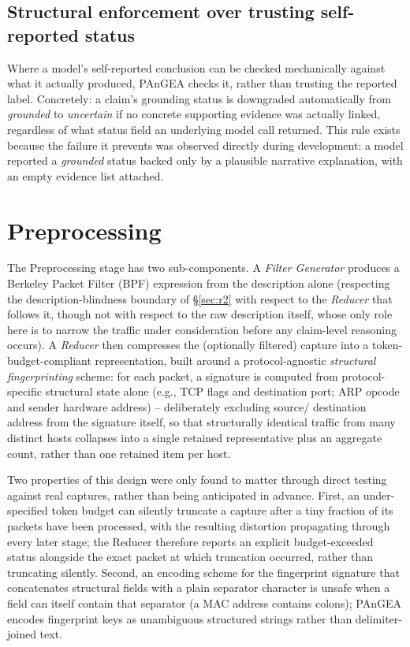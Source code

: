 \documentclass[sigconf,nonacm]{acmart}
\begin{document}
\subsection{Structural enforcement over trusting self-reported status}
\label{sec:enforcement}

Where a model's self-reported conclusion can be checked mechanically against
what it actually produced, PAnGEA checks it, rather than trusting the reported
label. Concretely: a claim's grounding status is downgraded automatically from
\emph{grounded} to \emph{uncertain} if no concrete supporting evidence was
actually linked, regardless of what status field an underlying model call
returned. This rule exists because the failure it prevents was observed
directly during development: a model reported a \emph{grounded} status backed
only by a plausible narrative explanation, with an empty evidence list attached.

\section{Preprocessing}
\label{sec:preprocessing}

The Preprocessing stage has two sub-components. A \emph{Filter Generator}
produces a Berkeley Packet Filter (BPF) expression from the description alone
(respecting the description-blindness boundary of \S\ref{sec:r2} with respect
to the \emph{Reducer} that follows it, though not with respect to the raw
description itself, whose only role here is to narrow the traffic under
consideration before any claim-level reasoning occurs). A \emph{Reducer} then
compresses the (optionally filtered) capture into a token-budget-compliant
representation, built around a protocol-agnostic \emph{structural
fingerprinting} scheme: for each packet, a signature is computed from
protocol-specific structural state alone (e.g., TCP flags and destination port;
ARP opcode and sender hardware address) -- deliberately excluding source/
destination address from the signature itself, so that structurally identical
traffic from many distinct hosts collapses into a single retained
representative plus an aggregate count, rather than one retained item per host.

Two properties of this design were only found to matter through direct
testing against real captures, rather than being anticipated in advance. First,
an under-specified token budget can silently truncate a capture after a tiny
fraction of its packets have been processed, with the resulting distortion
propagating through every later stage; the Reducer therefore reports an
explicit budget-exceeded status alongside the exact packet at which truncation
occurred, rather than truncating silently. Second, an encoding scheme for the
fingerprint signature that concatenates structural fields with a plain
separator character is unsafe when a field can itself contain that separator
(a MAC address contains colons); PAnGEA encodes fingerprint keys as
unambiguous structured strings rather than delimiter-joined text.
\end{document}
